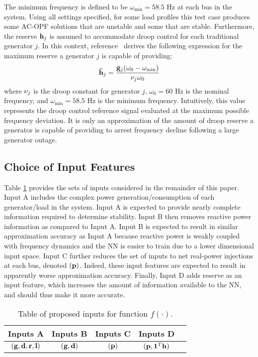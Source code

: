 \documentclass[lettersize,journal]{IEEEtran}
\begin{document}
The minimum frequency is defined to be $\omega_{\text{min}}=58.5$ Hz at each bus in the system.  Using all settings specified, for some load profiles this test case produces some AC-OPF solutions that are unstable and some that are stable. Furthermore, the reserve $\bold{h}_j$ is assumed to accommodate droop control for each traditional generator $j$.  In this context, reference~\cite{garcia2021requirements} derives the following expression for the maximum reserve a generator $j$ is capable of providing: 
$$\bold{\bar{h}}_j=\frac{\bar{\bold{g}}_j(\omega_0-\omega_{\min})}{\bold{\nu}_j\omega_0}$$
where $\bold{\nu}_j$ is the droop constant for generator $j$, $\omega_0=60$ Hz is the nominal frequency, and $\omega_{\min}=58.5$ Hz is the minimum frequency.  Intuitively, this value represents the droop control reference signal evaluated at the maximum possible frequency deviation.  It is only an approximation of the amount of droop reserve a generator is capable of providing to arrest frequency decline following a large generator outage. 

\subsection{Choice of Input Features}\label{sec:inputchoice}
Table \ref{InputTable} provides the sets of inputs considered in the remainder of this paper. Input A includes the complex power generation/consumption of each generator/load in the system.  Input A is expected to provide nearly complete information required to determine stability.  Input B then removes reactive power information as compared to Input A.  Input B is expected to result in similar approximation accuracy as Input A because reactive power is weakly coupled with frequency dynamics and the NN is easier to train due to a lower dimensional input space.  Input C further reduces the set of inputs to net real-power injections at each bus, denoted $(\bold{p})$.  Indeed, these input features are expected to result in apparently worse approximation accuracy.  Finally, Input D adds reserve as an input feature, which increases the amount of information available to the NN, and should thus make it more accurate. 

\setlength{\tabcolsep}{3pt} %
\renewcommand{\arraystretch}{1.3} %
\begin{table}[h!]
\vspace{-2pt}
\caption[]{\label{InputTable} Table of proposed inputs for function $f(\cdot)$.}
\vspace{-15pt}
\begin{center}
\begin{tabular}{|c|c|c|c|c|} 
	\hline
	Inputs A&Inputs B&Inputs C&Inputs D\\
	\hline
    $(\bold{g},\bold{d},\bold{r},\bold{l})$&$(\bold{g},\bold{d})$&$(\bold{p})$&$(\bold{p},\bold{1}^T\bold{h})$\\
	\hline
\end{tabular}
\end{center}
\vspace{0pt}
\end{table}
\end{document}
